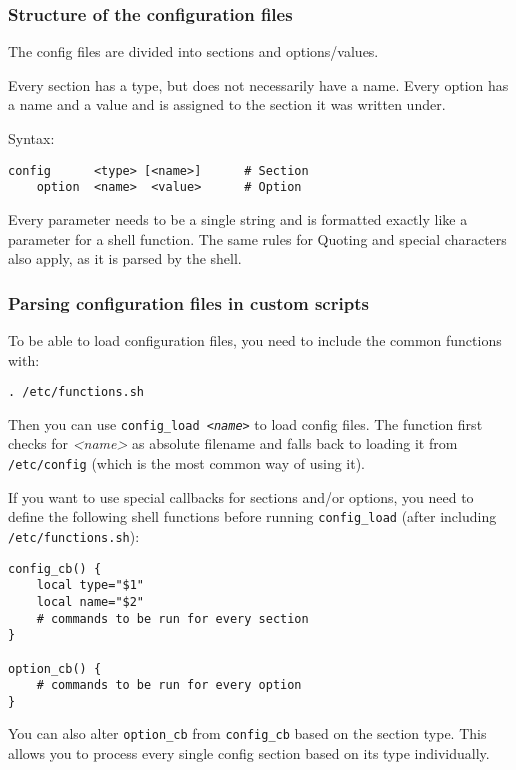 \subsubsection{Structure of the configuration files}

The config files are divided into sections and options/values.

Every section has a type, but does not necessarily have a name.
Every option has a name and a value and is assigned to the section
it was written under.

Syntax:

\begin{Verbatim}
config      <type> [<name>]	     # Section
    option  <name>  <value>      # Option
\end{Verbatim}

Every parameter needs to be a single string and is formatted exactly
like a parameter for a shell function. The same rules for Quoting and 
special characters also apply, as it is parsed by the shell.

\subsubsection{Parsing configuration files in custom scripts}

To be able to load configuration files, you need to include the common 
functions with:

\begin{Verbatim}
. /etc/functions.sh
\end{Verbatim}

Then you can use \texttt{config\_load \textit{<name>}} to load config files. The function 
first checks for \textit{<name>} as absolute filename and falls back to loading 
it from \texttt{/etc/config} (which is the most common way of using it).

If you want to use special callbacks for sections and/or options, you
need to define the following shell functions before running \texttt{config\_load}
(after including \texttt{/etc/functions.sh}):

\begin{Verbatim}
config_cb() {
	local type="$1"
	local name="$2"
	# commands to be run for every section
}

option_cb() {
	# commands to be run for every option
}
\end{Verbatim}

You can also alter \texttt{option\_cb} from \texttt{config\_cb} based on the section type.
This allows you to process every single config section based on its type
individually.

